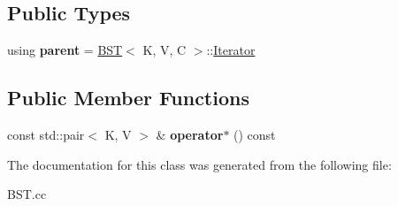 \subsection*{Public Types}
\begin{DoxyCompactItemize}
\item 
\mbox{\label{classBST_1_1ConstIterator_a544bf0228b0e126332f80d1d48e1340c}} 
using {\bfseries parent} = \hyperlink{classBST}{B\+ST}$<$ K, V, C $>$\+::\hyperlink{classBST_1_1Iterator}{Iterator}
\end{DoxyCompactItemize}
\subsection*{Public Member Functions}
\begin{DoxyCompactItemize}
\item 
\mbox{\label{classBST_1_1ConstIterator_a55a80aeaffdcc3c6614c7a00f6f30bcf}} 
const std\+::pair$<$ K, V $>$ \& {\bfseries operator$\ast$} () const
\end{DoxyCompactItemize}


The documentation for this class was generated from the following file\+:\begin{DoxyCompactItemize}
\item 
B\+S\+T.\+cc\end{DoxyCompactItemize}
